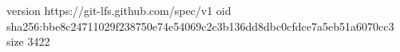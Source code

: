 version https://git-lfs.github.com/spec/v1
oid sha256:bbe8c24711029f238750e74e54069c2c3b136dd8dbc0cfdce7a5eb51a6070cc3
size 3422
